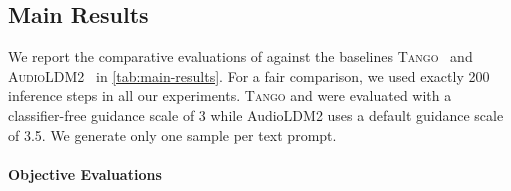 \begin{table*}[t]
\centering
\caption{Objective evaluation results for audio generation in the presence of temporal events or non-temporal events in the text prompt in the AudioCaps test set. }
\label{tab:temporal-analysis}
\end{table*}
\subsection{Main Results}

We report the comparative evaluations of \model{} against the baselines \textsc{Tango}~\cite{ghosal2023text} and \textsc{AudioLDM2}~\cite{liu2023audioldm2} in \cref{tab:main-results}. For a fair comparison, we used exactly 200 inference steps in all our experiments. \textsc{Tango} and \model{} were evaluated with a classifier-free guidance scale of 3 while AudioLDM2 uses a default guidance scale of 3.5. We generate only one sample per text prompt.

\paragraph{\bf Objective Evaluations}


